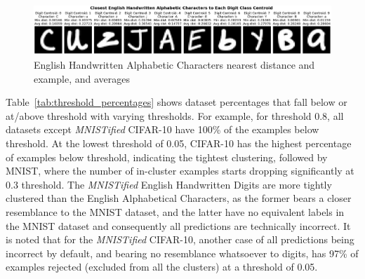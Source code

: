 \begin{figure}[ht!]
    \centering
    \includegraphics[width=0.99\columnwidth]{Figures/closest_alphabetic_characters_to_each_digit.png}
    \caption{English Handwritten Alphabetic Characters nearest distance and example, and averages}
\label{fig:closest_alphabetic_characters_to_each_digit}
\end{figure}



Table~\ref{tab:threshold_percentages} shows dataset percentages that fall below or at/above threshold with varying thresholds. For example, for threshold 0.8, all datasets except \textit{MNISTified} CIFAR-10 have 100\% of the examples below threshold. At the lowest threshold of 0.05, CIFAR-10 has the highest percentage of examples below threshold, indicating the tightest clustering, followed by MNIST, where the number of in-cluster examples starts dropping significantly at 0.3 threshold. The \textit{MNISTified} English Handwritten Digits are more tightly clustered than the English Alphabetical Characters, as the former bears a closer resemblance to the MNIST dataset, and the latter have no equivalent labels in the MNIST dataset and consequently all predictions are technically incorrect. It is noted that for the \textit{MNISTified} CIFAR-10, another case of all predictions being incorrect by default, and bearing no resemblance whatsoever to digits, has 97\% of examples rejected (excluded from all the clusters) at a threshold of 0.05. %

